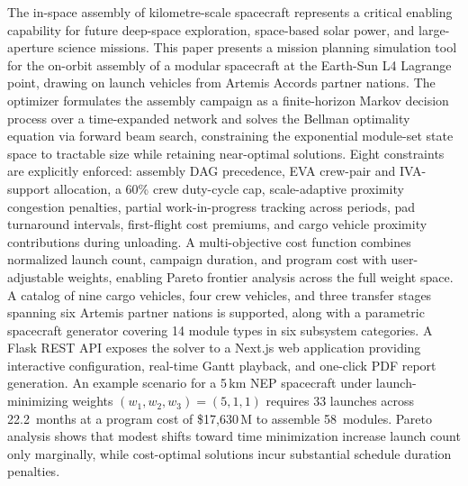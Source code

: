 The in-space assembly of kilometre-scale spacecraft represents a
critical enabling capability for future deep-space exploration,
space-based solar power, and large-aperture science missions.
This paper presents a mission planning simulation tool for the
on-orbit assembly of a modular spacecraft at the Earth-Sun L4
Lagrange point, drawing on launch vehicles from Artemis Accords
partner nations.
The optimizer formulates the assembly campaign as a
finite-horizon Markov decision process over a time-expanded
network and solves the Bellman optimality equation via forward
beam search, constraining the exponential module-set state space
to tractable size while retaining near-optimal solutions.
Eight constraints are explicitly enforced: assembly DAG
precedence, EVA crew-pair and IVA-support allocation, a 60\%
crew duty-cycle cap, scale-adaptive proximity congestion
penalties, partial work-in-progress tracking across periods,
pad turnaround intervals, first-flight cost premiums, and cargo
vehicle proximity contributions during unloading.
A multi-objective cost function combines normalized launch count,
campaign duration, and program cost with user-adjustable weights,
enabling Pareto frontier analysis across the full weight space.
A catalog of nine cargo vehicles, four crew vehicles, and three
transfer stages spanning six Artemis partner nations is supported,
along with a parametric spacecraft generator covering 14 module
types in six subsystem categories.
A Flask REST API exposes the solver to a Next.js web application
providing interactive configuration, real-time Gantt playback,
and one-click PDF report generation.
An example scenario for a 5\,km NEP spacecraft under
launch-minimizing weights
$(w_1, w_2, w_3) = (5, 1, 1)$
requires 33 launches across 22.2~months at a program cost of
\$17{,}630\,M to assemble 58~modules.
Pareto analysis shows that modest shifts toward time minimization
increase launch count only marginally, while cost-optimal
solutions incur substantial schedule duration penalties.
